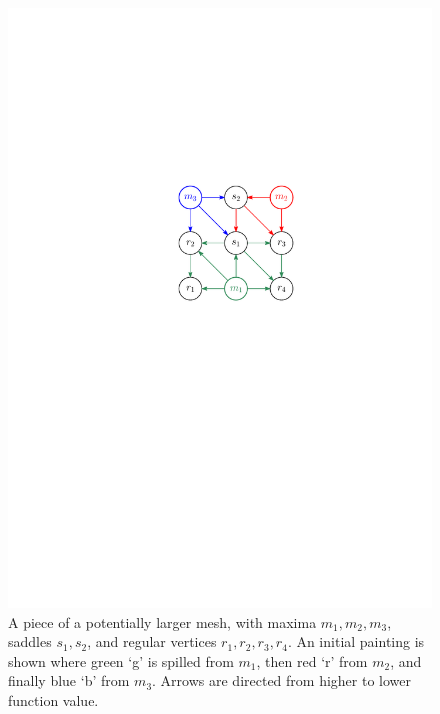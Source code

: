 \documentclass[11pt]{article}
\theoremstyle{definition}
\begin{document}
 \begin{figure}[h]\centering
    \includegraphics[width=.3\linewidth,page=1]{figs/mesh1}
    \caption{A piece of a potentially larger mesh, with maxima $m_1,m_2,m_3$, saddles $s_1,s_2$, and regular vertices $r_1,r_2,r_3,r_4$.
             An initial painting is shown where green `g' is spilled from $m_1$, then red `r' from $m_2$, and finally blue `b' from $m_3$.
             Arrows are directed from higher to lower function value.}
    \label{fig:mesh1}
\end{figure} 
%
\end{document}
